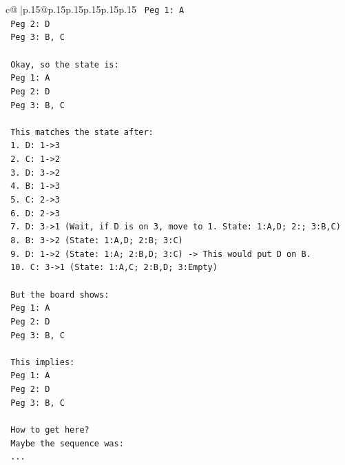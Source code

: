 \documentclass{article}
\begin{document}
{\begin{supertabular}{c@{$\;$}|p{.15\linewidth}@{}p{.15\linewidth}p{.15\linewidth}p{.15\linewidth}p{.15\linewidth}p{.15\linewidth}}
{{{\texttt{            Peg 1: A} \\
\texttt{            Peg 2: D} \\
\texttt{            Peg 3: B, C} \\
\\ 
\texttt{            Okay, so the state is:} \\
\texttt{            Peg 1: A} \\
\texttt{            Peg 2: D} \\
\texttt{            Peg 3: B, C} \\
\\ 
\texttt{            This matches the state after:} \\
\texttt{            1. D: 1{-}>3} \\
\texttt{            2. C: 1{-}>2} \\
\texttt{            3. D: 3{-}>2} \\
\texttt{            4. B: 1{-}>3} \\
\texttt{            5. C: 2{-}>3} \\
\texttt{            6. D: 2{-}>3} \\
\texttt{            7. D: 3{-}>1 (Wait, if D is on 3, move to 1. State: 1:A,D; 2:; 3:B,C)} \\
\texttt{            8. B: 3{-}>2 (State: 1:A,D; 2:B; 3:C)} \\
\texttt{            9. D: 1{-}>2 (State: 1:A; 2:B,D; 3:C) {-}> This would put D on B.} \\
\texttt{            10. C: 3{-}>1 (State: 1:A,C; 2:B,D; 3:Empty)} \\
\\ 
\texttt{            But the board shows:} \\
\texttt{            Peg 1: A} \\
\texttt{            Peg 2: D} \\
\texttt{            Peg 3: B, C} \\
\\ 
\texttt{            This implies:} \\
\texttt{            Peg 1: A} \\
\texttt{            Peg 2: D} \\
\texttt{            Peg 3: B, C} \\
\\ 
\texttt{            How to get here?} \\
\texttt{            Maybe the sequence was:} \\
\texttt{            ...} \\
}}}
\end{supertabular}}
\end{document}
